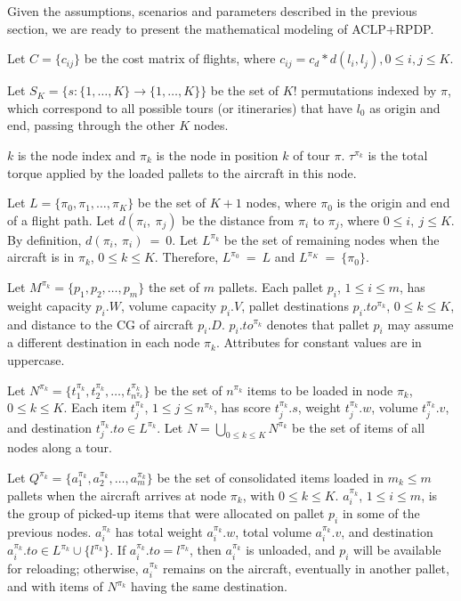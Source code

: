 \documentclass[preprint,authoryear]{elsarticle}
\begin{document}
Given the assumptions, scenarios and parameters described in the previous section, we are ready to present the mathematical modeling of ACLP+RPDP.

Let $C=\{c_{ij}\}$ be the cost matrix of flights, where $c_{ij} = c_d*d(l_i,l_j), 0 \leq i,j \leq K$.

Let $S_K = \{s: \{1, \dots, K\} \rightarrow \{1, \dots, K\} \}$ be the set of $K!$ permutations {\color{blue} indexed by $\pi$}, which correspond to all possible tours (or itineraries) that have $l_0$ as origin and end, passing through the other $K$ nodes.

{\color{blue}
$k$ is the node index and $\pi_k$ is the node in position $k$ of tour $\pi$. $\tau^{\pi_k}$ is the total torque applied by the loaded pallets to the aircraft in this node. 


Let $L = \{ \pi_0, \pi_1, \ldots, \pi_K \}$ be the set of $K+1$ nodes, where $\pi_0$ is the origin and end of a flight path. Let $d(\pi_i,\ \pi_j)$ be the distance from $\pi_i$ to $\pi_j$, where $0 \leq i,\ j \leq K$. By definition, $d(\pi_i,\ \pi_i)\ =\ 0$.
Let $L^{\pi_k}$ be the set of remaining nodes when the aircraft is in $\pi_k$, $0 \leq k \leq K$. Therefore, $L^{\pi_0}\ =\ L$ and $L^{\pi_K}\ =\ \{ \pi_0 \}$.
}

Let $M^{\pi_k} = \{p_1, p_2, \ldots, p_m \}$ the set of $m$ pallets. Each pallet $p_i$, $1 \leq i \leq m$, has weight capacity $p_i.W$, volume capacity $p_i.V$, pallet destinations $p_i.to^{\pi_k}$, $0 \leq k \leq K$, and distance to the CG of aircraft $p_i.D$. $p_i.to^{\pi_k}$ denotes that pallet $p_i$ may assume a different destination in each node ${\pi_k}$. Attributes for constant values are in uppercase.

Let $N^{\pi_k} = \{t^{\pi_k}_1, t^{\pi_k}_2, \ldots, t^{\pi_k}_{n^{\pi_k}} \}$ be the set of $n^{\pi_k}$ items to be loaded in node $\pi_k$, $0 \leq k \leq K$. Each item $t^{\pi_k}_j$, $1 \leq j \leq n^{\pi_k}$, has score $t^{\pi_k}_j.s$, weight $t^{\pi_k}_j.w$, volume $t^{\pi_k}_j.v$, and destination $t^{\pi_k}_j.to \in L^{\pi_k}$. Let $N = \bigcup_{0 \leq k \leq K} N^{\pi_k}$ be the set of items of all nodes along a tour.

Let $Q^{\pi_k} = \{a^{\pi_k}_1, a^{\pi_k}_2, \ldots, a^{\pi_k}_{m} \}$ be the set of consolidated items loaded in $m_k \leq m$ pallets when the aircraft arrives at node $\pi_k$, with $0 \leq k \leq K$. $a^{\pi_k}_i$, $1 \leq i \leq m$, is the group of picked-up items that were allocated on pallet $p_i$ in some of the previous nodes. $a^{\pi_k}_i$ has total weight $a^{\pi_k}_i.w$, total volume $a^{\pi_k}_i.v$, and destination $a^{\pi_k}_i.to \in L^{\pi_k} \cup \{l^{\pi_k}\}$. If $a^{\pi_k}_i.to = l^{\pi_k}$, then $a^{\pi_k}_i$ is unloaded, and $p_i$ will be available for reloading; otherwise, $a^{\pi_k}_i$ remains on the aircraft, eventually in another pallet, and with items of $N^{\pi_k}$ having the same destination.
\end{document}
